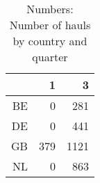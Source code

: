 \begin{table}[ht]
\centering
\begin{tabular}{rrr}
  \hline
 & 1 & 3 \\ 
  \hline
BE & 0 & 281 \\ 
  DE & 0 & 441 \\ 
  GB & 379 & 1121 \\ 
  NL & 0 & 863 \\ 
   \hline
\end{tabular}
\caption{Numbers: Number of hauls by country and quarter} 
\end{table}
